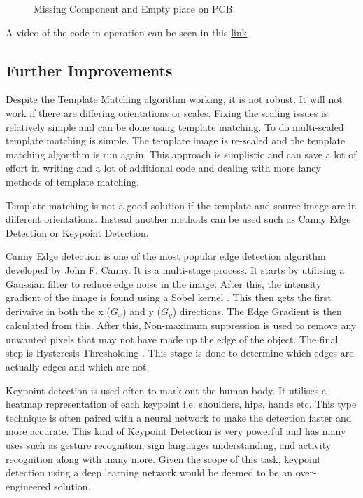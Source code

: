 \documentclass[conference]{IEEEtran}
\begin{document}
\begin{figure}
\centering
{}
\caption{Missing Component and Empty place on PCB}
\label{fig:Missing_component_and_empty_place_on_PCB}
\end{figure} 

A video of the code in operation can be seen in this \href{https://github.com/LukeDWaller99/Aint308}{link}

\subsection{Further Improvements}

Despite the Template Matching algorithm working, it is not robust. It will not work if there are differing orientations or scales. Fixing the scaling issues is relatively simple and can be done using template matching. To do multi-scaled template matching is simple. The template image is re-scaled and the template matching algorithm is run again. \cite{ref:open_cv_templae_matching_scaling} This approach is simplistic and can save a lot of effort in writing and a lot of additional code and dealing with more fancy methods of template matching. 

Template matching is not a good solution if the template and source image are in different orientations. Instead another methods can be used such as Canny Edge Detection or Keypoint Detection. 

Canny Edge detection is one of the most popular edge detection algorithm developed by John F. Canny. It is a multi-stage process. It starts by utilising a Gaussian filter \cite{ref:Gaussian_filters} to reduce edge noise in the image. After this, the intensity gradient of the image is found using a Sobel kernel \cite{ref:sobel_kernal}. This then gets the first derivaive in both the x ($G_x$) and y ($G_y$) directions. The Edge Gradient is then calculated from this.  After this, Non-maximum suppression \cite{ref:non-maximum_supression} is used to remove any unwanted pixels that may not have made up the edge of the object. The final step is Hysteresis Thresholding \cite{ref:hysteresis_thresholding}. This stage is done to determine which edges are actually edges and which are not. 

Keypoint detection is used often to mark out the human body. It utilises a heatmap representation of each keypoint i.e. shoulders, hips, hands etc. \cite{ref:keypoint_detection} This type technique is often paired with a neural network to make the detection faster and more accurate. This kind of Keypoint Detection is very powerful and has many uses such as gesture recognition, sign languages understanding, and activity recognition along with many more. \cite{ref:keypoint_detection_using_deep_learning} Given the scope of this task, keypoint detection using a deep learning network would be deemed to be an over-engineered solution.
\end{document}
